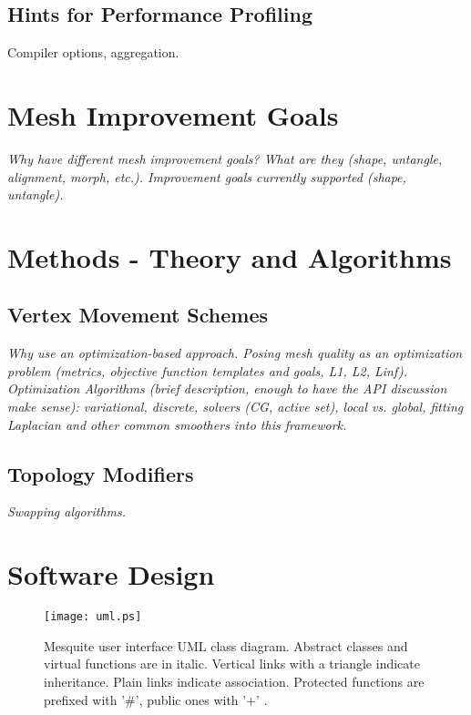 \documentclass[psfig]{article}
\begin{document}
\subsection{Hints for Performance Profiling}
Compiler options, aggregation.

\section{Mesh Improvement Goals}

{\it Why have different mesh improvement goals? What are they (shape,
untangle, alignment, morph, etc.). Improvement goals currently
supported (shape, untangle).  }

\section{Methods - Theory and Algorithms}

\subsection{Vertex Movement Schemes}

{\it Why use an optimization-based approach. Posing mesh quality as an
optimization problem (metrics, objective function templates and goals,
L1, L2, Linf).  Optimization Algorithms (brief description, enough to
have the API discussion make sense): variational, discrete, solvers
(CG, active set), local vs. global, fitting Laplacian and other common
smoothers into this framework.}

\subsection{Topology Modifiers}

{\it Swapping algorithms.}

\section{Software Design}
\label{sec:arch}

\begin{figure*}[htb]
\begin{center}
    \texttt{[image: uml.ps]}
    \caption{Mesquite user interface UML class diagram.  Abstract
             classes and virtual functions are in italic. Vertical
             links with a triangle indicate inheritance. Plain links
             indicate association. Protected functions are prefixed
             with '\#', public ones with '+' .}
    \label{fig:uml}
\end{center}
\end{figure*}
\end{document}
